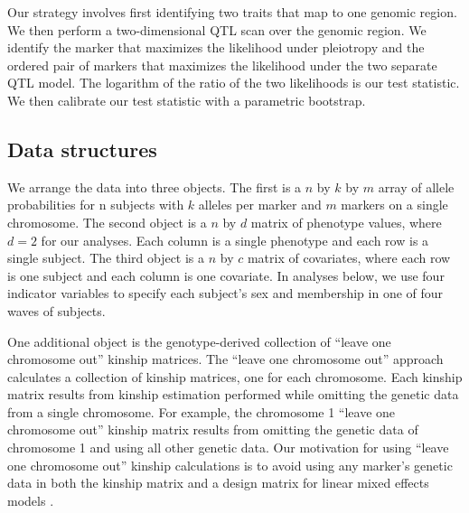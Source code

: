 \documentclass[12pt,twoside, lineno]{gsajnl}
\begin{document}
Our strategy involves first identifying two traits that map to one genomic region. We then perform a two-dimensional QTL scan over the genomic region. We identify the marker that maximizes the likelihood under pleiotropy and the ordered pair of markers that maximizes the likelihood under the two separate QTL model. The logarithm of the ratio of the two likelihoods is our test statistic. We then calibrate our test statistic with a parametric bootstrap.

\subsection{Data structures}

We arrange the data into three objects. The first is a $n$ by $k$ by $m$ array of allele probabilities for n subjects with $k$ alleles per marker and $m$ markers on a single chromosome. The second object is a $n$ by $d$ matrix of phenotype values, where $d = 2$ for our analyses. Each column is a single phenotype and each row is a single subject. The third object is a $n$ by $c$ matrix of covariates, where each row is one subject and each column is one covariate. In analyses below, we use four indicator variables to specify each subject's sex and membership in one of four waves of subjects.

One additional object is the genotype-derived collection of ``leave one chromosome out'' kinship matrices. The ``leave one chromosome out'' approach calculates a collection of kinship matrices, one for each chromosome. Each kinship matrix results from kinship estimation performed while omitting the genetic data from a single chromosome. For example, the chromosome 1 ``leave one chromosome out'' kinship matrix results from omitting the genetic data of chromosome 1 and using all other genetic data. Our motivation for using ``leave one chromosome out'' kinship calculations is to avoid using any marker's genetic data in both the kinship matrix and a design matrix for linear mixed effects models \citep{yang2014advantages}.




\end{document}
